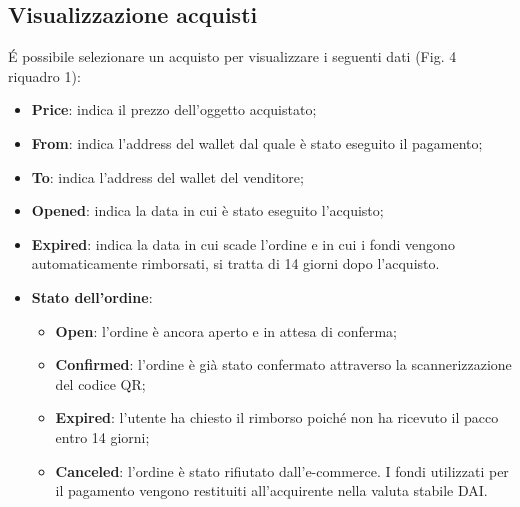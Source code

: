 \documentclass[a4paper, 12pt]{article}
\begin{document}
\subsection{Visualizzazione acquisti}
É possibile selezionare un acquisto per visualizzare i seguenti dati (Fig. 4 riquadro 1):
\begin{itemize}
\item \textbf{Price}: indica il prezzo dell'oggetto acquistato;
\item \textbf{From}: indica l'address del wallet dal quale è stato eseguito il pagamento;
\item \textbf{To}: indica l'address del wallet del venditore;
\item \textbf{Opened}: indica la data in cui è stato eseguito l'acquisto;
\item \textbf{Expired}: indica la data in cui scade l'ordine e in cui i fondi vengono automaticamente rimborsati, si tratta di 14 giorni dopo l'acquisto.
\item \textbf{Stato dell'ordine}:
  \begin{itemize}
    \item \textbf{Open}: l'ordine è ancora aperto e in attesa di conferma;
    \item \textbf{Confirmed}: l'ordine è già stato confermato attraverso la scannerizzazione del codice QR;
    \item \textbf{Expired}: l'utente ha chiesto il rimborso poiché non ha ricevuto il pacco entro 14 giorni;
    \item \textbf{Canceled}: l'ordine è stato rifiutato dall'e-commerce. I fondi utilizzati per il pagamento vengono restituiti all'acquirente nella valuta stabile DAI.
  \end{itemize}
\end{itemize}
\end{document}
